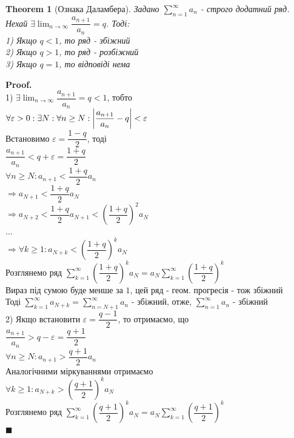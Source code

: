 \documentclass[a4paper, 14pt]{extarticle}
\def\huge{\displaystyle}
\def\bigline{\vspace{5mm}\\}
\theoremstyle{theoremdd}
\newtheorem{theorem}{Theorem}[subsection]
\theoremstyle{theoremdd}
\theoremstyle{theoremdd}
\theoremstyle{theoremdd}
\theoremstyle{theoremdd}
\theoremstyle{theoremdd}
\theoremstyle{theoremdd}
\theoremstyle{theoremdd}
\newenvironment{pf}{\vspace*{-3mm} \textbf{Proof. \\}}{$\blacksquare$}
\begin{document}
\begin{theorem}[Ознака Даламбера]
Задано $\huge \sum_{n=1}^{\infty} a_n$ - строго додатний ряд. Нехай $\exists \huge \lim_{n \to \infty} \dfrac{a_{n+1}}{a_n} = q$. Тоді:\\
1) Якщо $q<1$, то ряд - збіжний\\
2) Якщо $q>1$, то ряд - розбіжний\\
3) Якщо $q=1$, то відповіді нема
\end{theorem}

\begin{pf}
1) $\exists \huge \lim_{n \to \infty} \dfrac{a_{n+1}}{a_n} = q <1$, тобто\\
$\forall \varepsilon > 0: \exists N: \forall n \geq N: \abs{\dfrac{a_{n+1}}{a_n} - q} < \varepsilon$\\
Встановимо $\varepsilon = \dfrac{1-q}{2}$, тоді\\
$\dfrac{a_{n+1}}{a_n} < q + \varepsilon = \dfrac{1+q}{2}$\\
$\forall n \geq N: a_{n+1} < \dfrac{1+q}{2}a_n$\\
$\Rightarrow a_{N+1} < \dfrac{1+q}{2}a_N$\\
$\Rightarrow a_{N+2} < \dfrac{1+q}{2}a_{N+1} < \left( \dfrac{1+q}{2} \right)^2 a_N$\\
$\dots$\\
$\Rightarrow \forall k \geq 1: a_{N+k} < \left( \dfrac{1+q}{2} \right)^k a_N$\\
Розглянемо ряд $\huge \sum_{k=1}^{\infty} \left( \dfrac{1+q}{2} \right)^k a_N = a_N \sum_{k=1}^{\infty} \left( \dfrac{1+q}{2} \right)^k$\\
Вираз під сумою буде менше за $1$, цей ряд - геом. прогресія - тож збіжний\\
Тоді $\huge \sum_{k=1}^{\infty} a_{N+k} = \sum_{n = N+1}^{\infty} a_{n}$ - збіжний, отже, $\huge \sum_{n = 1}^{\infty} a_n$ - збіжний
\bigline
2) Якщо встановити $\varepsilon = \dfrac{q-1}{2}$, то отримаємо, що \\ $\dfrac{a_{n+1}}{a_n} > q - \varepsilon = \dfrac{q+1}{2}$\\
$\forall n \geq N: a_{n+1} > \dfrac{q+1}{2}a_n$\\
Аналогічними міркуваннями отримаємо\\
$\forall k \geq 1: a_{N+k} > \left( \dfrac{q+1}{2} \right)^k a_N$\\
Розглянемо ряд $\huge \sum_{k=1}^{\infty} \left( \dfrac{q+1}{2} \right)^k a_N = a_N \sum_{k=1}^{\infty} \left( \dfrac{q+1}{2} \right)^k$\\

\end{pf}
\end{document}
